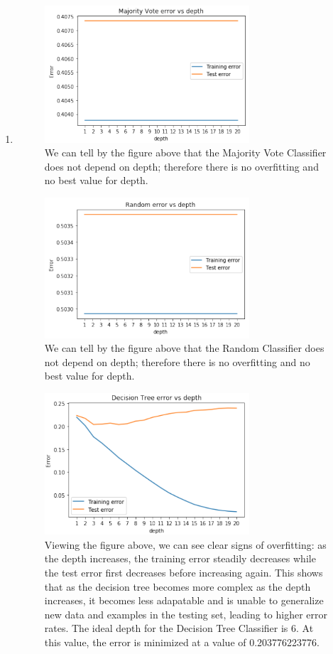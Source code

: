 \documentclass[11pt]{article}
\newcommand{\solution}[1]{{{\color{blue}{\bf Solution:} {#1}}}}
\begin{document}
\begin{enumerate}
\item
\solution{
\begin{figure}[!htbp]
    \centering
    \includegraphics[width=3in]{5e-majority.png}
    \caption{We can tell by the figure above that the Majority Vote Classifier does not depend on depth; therefore there is no overfitting and no best value for depth.}
\end{figure}
\vspace{1cm}

\begin{figure}[!htbp]
    \centering
    \includegraphics[width=3in]{5e-random.png}
    \caption{We can tell by the figure above that the Random Classifier does not depend on depth; therefore there is no overfitting and no best value for depth.}
\end{figure}
\vspace{2cm}

\begin{figure}[!htbp]
    \centering
    \includegraphics[width=3in]{5e-tree.png}
    \caption{Viewing the figure above, we can see clear signs of overfitting: as the depth increases, the training error steadily decreases while the test error first decreases before increasing again. This shows that as the decision tree becomes more complex as the depth increases, it becomes less adapatable and is unable to generalize new data and examples in the testing set, leading to higher error rates. The ideal depth for the Decision Tree Classifier is 6. At this value, the error is minimized at a value of 0.203776223776.}
\end{figure}
\vspace{1cm}
}


\end{enumerate}
\end{document}
